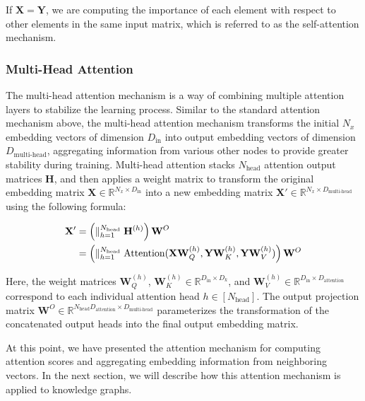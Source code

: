 If $\mathbf{X} = \mathbf{Y}$, we are computing the importance of each element with respect to other elements in the same input matrix, which is referred to as the self-attention mechanism.


\subsubsection{Multi-Head Attention}

The multi-head attention mechanism is a way of combining multiple attention layers to stabilize the learning process. Similar to the standard attention mechanism above, the multi-head attention mechanism transforms the initial $N_x$ embedding vectors of dimension $D_{\text{in}}$ into output embedding vectors of dimension $D_{\text{multi-head}}$, aggregating information from various other nodes to provide greater stability during training. Multi-head attention stacks $N_{\text{head}}$ attention output matrices $\mathbf{H}$, and then applies a weight matrix to transform the original embedding matrix $\mathbf{X} \in \mathbb{R}^{N_x \times D_\text{in}}$ into a new embedding matrix $\mathbf{X}' \in \mathbb{R}^{N_x \times D_{\text{multi-head}}}$ using the following formula:

\begin{equation}
	\label{headAttention}
	\begin{split}
		\mathbf{X}'& =\left(\bigparallel_{h=1}^{N_{\text{head}}}\mathbf{H}^{(h)}\right)\mathbf{W}^{O} \\
		& = \left(\bigparallel_{h=1}^{N_{\text{head}}} \text{Attention}(\mathbf{X} \mathbf{W}_Q^{(h)}, \mathbf{Y} \mathbf{W}_K^{(h)}, \mathbf{Y} \mathbf{W}_V^{(h)}) \right)\mathbf{W}^{O}
	\end{split}
\end{equation}

Here, the weight matrices $\mathbf{W}_Q^{(h)}$, $\mathbf{W}_K^{(h)} \in \mathbb{R}^{D_{\text{in}} \times D_{k}}$, and $\mathbf{W}_V^{(h)} \in \mathbb{R}^{D_{\text{in}} \times D_{\text{attention}}}$ correspond to each individual attention head $h \in [N_{\text{head}}]$. The output projection matrix $\mathbf{W}^{O} \in \mathbb{R}^{N_{\text{head}} D_{\text{attention}} \times D_{\text{multi-head}}}$ parameterizes the transformation of the concatenated output heads into the final output embedding matrix.

At this point, we have presented the attention mechanism for computing attention scores and aggregating embedding information from neighboring vectors. In the next section, we will describe how this attention mechanism is applied to knowledge graphs.

